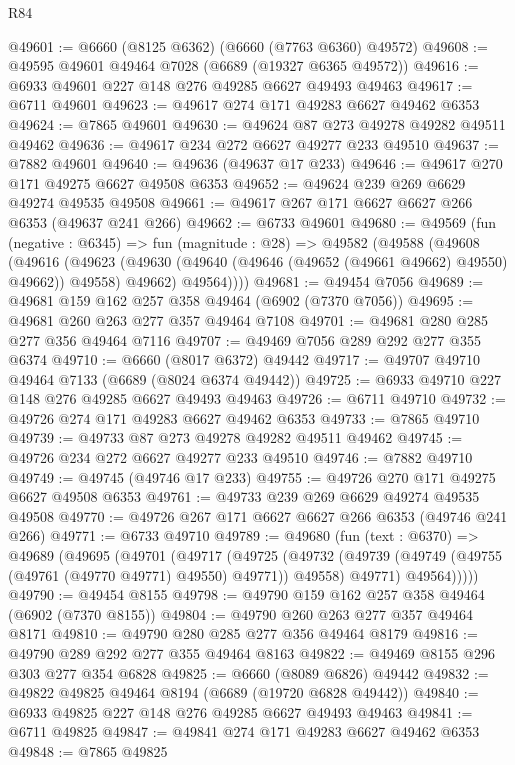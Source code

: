 \begin{lexlean}{R84}
\begin{coremodule}
@49601 := @6660 (@8125 @6362) (@6660 (@7763 @6360) @49572)
@49608 := @49595 @49601 @49464 @7028 (@6689 (@19327 @6365 @49572))
@49616 := @6933 @49601 @227 @148 @276 @49285 @6627 @49493 @49463
@49617 := @6711 @49601
@49623 := @49617 @274 @171 @49283 @6627 @49462 @6353
@49624 := @7865 @49601
@49630 := @49624 @87 @273 @49278 @49282 @49511 @49462
@49636 := @49617 @234 @272 @6627 @49277 @233 @49510
@49637 := @7882 @49601
@49640 := @49636 (@49637 @17 @233)
@49646 := @49617 @270 @171 @49275 @6627 @49508 @6353
@49652 := @49624 @239 @269 @6629 @49274 @49535 @49508
@49661 := @49617 @267 @171 @6627 @6627 @266 @6353 (@49637 @241 @266)
@49662 := @6733 @49601
@49680 := @49569
    (fun (negative : @6345) =>
    fun (magnitude : @28) =>
    @49582
      (@49588
        (@49608
          (@49616
            (@49623 (@49630 (@49640 (@49646 (@49652 (@49661 @49662) @49550) @49662)) @49558) @49662)
            @49564))))
@49681 := @49454 @7056
@49689 := @49681 @159 @162 @257 @358 @49464 (@6902 (@7370 @7056))
@49695 := @49681 @260 @263 @277 @357 @49464 @7108
@49701 := @49681 @280 @285 @277 @356 @49464 @7116
@49707 := @49469 @7056 @289 @292 @277 @355 @6374
@49710 := @6660 (@8017 @6372) @49442
@49717 := @49707 @49710 @49464 @7133 (@6689 (@8024 @6374 @49442))
@49725 := @6933 @49710 @227 @148 @276 @49285 @6627 @49493 @49463
@49726 := @6711 @49710
@49732 := @49726 @274 @171 @49283 @6627 @49462 @6353
@49733 := @7865 @49710
@49739 := @49733 @87 @273 @49278 @49282 @49511 @49462
@49745 := @49726 @234 @272 @6627 @49277 @233 @49510
@49746 := @7882 @49710
@49749 := @49745 (@49746 @17 @233)
@49755 := @49726 @270 @171 @49275 @6627 @49508 @6353
@49761 := @49733 @239 @269 @6629 @49274 @49535 @49508
@49770 := @49726 @267 @171 @6627 @6627 @266 @6353 (@49746 @241 @266)
@49771 := @6733 @49710
@49789 := @49680
    (fun (text : @6370) =>
    @49689
      (@49695
        (@49701
          (@49717
            (@49725
              (@49732
                (@49739 (@49749 (@49755 (@49761 (@49770 @49771) @49550) @49771)) @49558)
                @49771)
              @49564)))))
@49790 := @49454 @8155
@49798 := @49790 @159 @162 @257 @358 @49464 (@6902 (@7370 @8155))
@49804 := @49790 @260 @263 @277 @357 @49464 @8171
@49810 := @49790 @280 @285 @277 @356 @49464 @8179
@49816 := @49790 @289 @292 @277 @355 @49464 @8163
@49822 := @49469 @8155 @296 @303 @277 @354 @6828
@49825 := @6660 (@8089 @6826) @49442
@49832 := @49822 @49825 @49464 @8194 (@6689 (@19720 @6828 @49442))
@49840 := @6933 @49825 @227 @148 @276 @49285 @6627 @49493 @49463
@49841 := @6711 @49825
@49847 := @49841 @274 @171 @49283 @6627 @49462 @6353
@49848 := @7865 @49825

\end{coremodule}
\end{lexlean}
